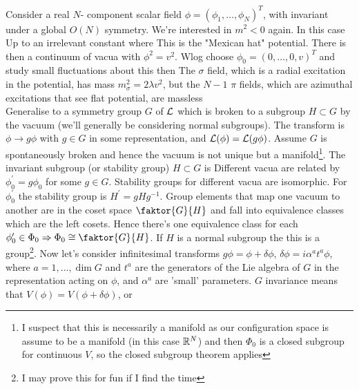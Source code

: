 \documentclass{article}
\begin{document}
Consider a real $N$- component scalar field $\phi=(\phi_1,\dots,\phi_N)^T$, with 
invariant under a global $O(N)$ symmetry. We're interested in $m^2 < 0$ again. In this case 
Up to an irrelevant constant where 
This is the "Mexican hat" potential. 
There is then a continuum of vacua with $\phi^2=v^2$. Wlog choose $\phi_0 = (0,\dots,0,v)^T$ and study small fluctuations about this 
then 
The $\sigma$ field, which is a radial excitation in the potential, has mass $m_\sigma^2=2\lambda v^2$, but the $N-1$ $\pi$ fields, which are azimuthal excitations that see flat potential, are massless \\
\newline
Generalise to a symmetry group $G$ of $\mathcal{L}$ which is broken to a subgroup $H\subset G$ by the vacuum (we'll generally be considering normal subgroups). The transform is $\phi \to g\phi$ with $g\in G$ in some representation, and $\mathcal{L}(\phi) = \mathcal{L}(g\phi)$. Assume $G$ is spontaneously broken and hence the vacuum is not unique but a manifold\footnote{I suspect that this is necessarily a manifold as our configuration space is assume to be a manifold (in this case $\mathbb{R}^N$) and then $\Phi_0$ is a closed subgroup for continuous $V$, so the closed subgroup theorem applies}. 
The invariant subgroup (or stability group) $H\subset G$ is 
Different vacua are related by $\phi_0^\prime = g\phi_0$ for some $g\in G$. Stability groups for different vacua are isomorphic. For $
\phi_0^\prime$ the stability group is $H^\prime = gHg^{-1}$. Group elements that map one vacuum to another are in the coset space $\faktor{G}{H}$ and fall into equivalence classes 
which are the left cosets. Hence there's one equivalence class for each $\phi_0^\prime \in \Phi_0 \Rightarrow \Phi_0 \cong \faktor{G}{H}$. If $H$ is a normal subgroup the this is a group\footnote{I may prove this for fun if I find the time}. Now let's consider infinitesimal transforms $g\phi = \phi + \delta \phi$, $\delta \phi = i \alpha^a t^a \phi$, where $a=1,\dots,\dim G$ and $t^a$ are the generators of the Lie algebra of $G$ in the representation acting on $\phi$, and $\alpha^a$ are 'small' parameters. $G$ invariance means that $V(\phi) = V(\phi+\delta\phi)$, or 
\end{document}
